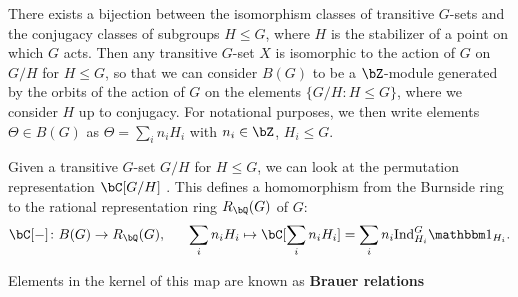 There exists a bijection between the isomorphism classes of transitive $G$-sets and the conjugacy classes of subgroups $H \leq G$, where $H$ is the stabilizer of a point on which $G$ acts. Then any transitive $G$-set $X$ is isomorphic to the action of $G$ on $G/H$ for $H \leq G$, so that we can consider $B(G)$ to be a $\bZ$-module generated by the orbits of the action of $G$ on the elements $\{G/H : H \leq G\}$, where we consider $H$ up to conjugacy. For notational purposes, we then write elements $\Theta \in B(G)$ as $\Theta = \sum_i n_i H_i$ with $n_i \in \bZ$, $H_i \leq G$.

Given a transitive $G$-set $G/H$ for $H\leq G$, we can look at the permutation representation $\bC[G/H]$ . This defines a homomorphism from the Burnside ring to the rational representation ring $R_{\bQ}(G)$ of $G$: 
\[ \bC[-] \colon B(G) \to R_{\bQ}(G),  \ \ \ \ \ \sum_i n_i H_i \mapsto \bC[\sum_i n_i H_i ] = \sum_i n_i \Ind_{H_i}^G \trivial_{H_i}. \]

Elements in the kernel of this map are known as \textbf{Brauer relations}